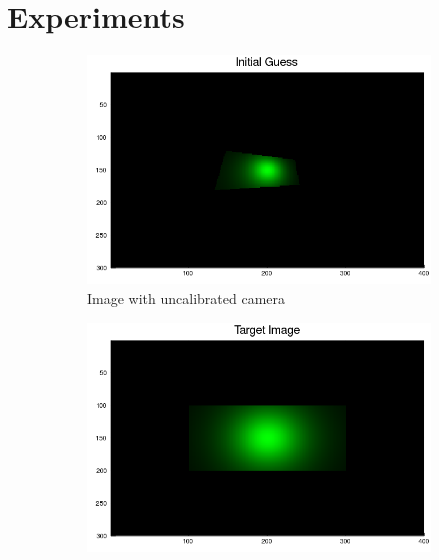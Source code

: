 \documentclass{juliacon}
\begin{document}

\section{Experiments}

\begin{figure}[!htb]
    \centering
    \begin{subfigure}[b]{0.23\textwidth}
        \centering
        \includegraphics[width=\textwidth]{images/camera/initial_guess_image.png}
        \caption{Image with uncalibrated camera}
        \label{fig:cam_guess}
    \end{subfigure}
    \hfill
    \begin{subfigure}[b]{0.23\textwidth}
        \centering
        \includegraphics[width=\textwidth]{images/camera/target_image.png}

\end{subfigure}
\end{figure}
\end{document}
